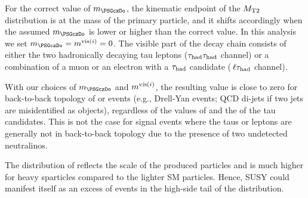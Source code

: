 For the correct value of $m_{\PSGczDo}$, the kinematic endpoint of the ${M_{\rm T2}}$ distribution is at the mass of the primary particle, and it shifts accordingly when the assumed $m_{\PSGczDo}$ is lower or higher than the correct value. In this analysis we set
$m_{\PSGczDo}=\mvisi=0$.
The visible part of the decay chain consists of either the two hadronically decaying tau leptons ($\tau_{\rm had} \tau_{\rm had}$ channel)
or a combination of a muon or an electron with a $\tau_{\rm had}$ candidate ($\,\ell\tau_{\rm had}$ channel).


With  our choices of $m_{\PSGczDo}$ and $m^{{\rm vis}(i)}$, the resulting \mttwo value is close to zero for back-to-back topology of \tauTau or \leptonTau  
events (e.g., Drell-Yan events; QCD di-jets if two jets are misidentified as \Tau objects), regardless of the values of \MPT and the \PT of 
the tau candidates. This is not the case for signal events where the taus or leptons are generally not in back-to-back topology due 
to the presence of two undetected neutralinos.

The distribution of \mttwo reflects the scale of the produced particles and is much higher for heavy sparticles
compared to the lighter SM particles. Hence, SUSY 
could manifest itself
as an excess of events in the high-side tail of the \mttwo distribution.
